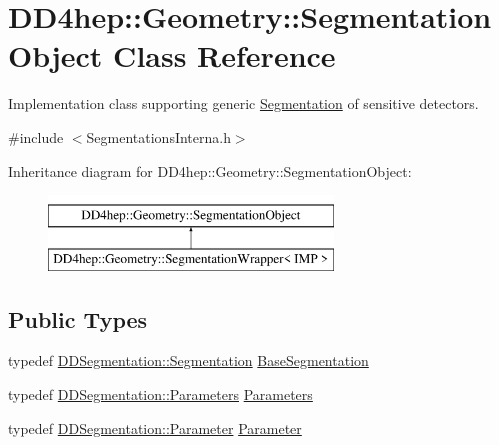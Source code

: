 \hypertarget{class_d_d4hep_1_1_geometry_1_1_segmentation_object}{}\section{D\+D4hep\+:\+:Geometry\+:\+:Segmentation\+Object Class Reference}
\label{class_d_d4hep_1_1_geometry_1_1_segmentation_object}


Implementation class supporting generic \hyperlink{class_d_d4hep_1_1_geometry_1_1_segmentation}{Segmentation} of sensitive detectors.  




{\ttfamily \#include $<$Segmentations\+Interna.\+h$>$}

Inheritance diagram for D\+D4hep\+:\+:Geometry\+:\+:Segmentation\+Object\+:\begin{figure}[H]
\begin{center}
\leavevmode
\includegraphics[height=2.000000cm]{class_d_d4hep_1_1_geometry_1_1_segmentation_object}
\end{center}
\end{figure}
\subsection*{Public Types}
\begin{DoxyCompactItemize}
\item 
typedef \hyperlink{class_d_d4hep_1_1_d_d_segmentation_1_1_segmentation}{D\+D\+Segmentation\+::\+Segmentation} \hyperlink{class_d_d4hep_1_1_geometry_1_1_segmentation_object_a57ca8eb515f079fdc61916df50468818}{Base\+Segmentation}
\item 
typedef \hyperlink{namespace_d_d4hep_1_1_d_d_segmentation_af38026430ca0e1ef64acdfc898f5dd3d}{D\+D\+Segmentation\+::\+Parameters} \hyperlink{class_d_d4hep_1_1_geometry_1_1_segmentation_object_adb4bb039e0cd15ea9fbe0232d07c49cc}{Parameters}
\item 
typedef \hyperlink{namespace_d_d4hep_1_1_d_d_segmentation_af6c6bad2a745d807a0ed00506fb34ccf}{D\+D\+Segmentation\+::\+Parameter} \hyperlink{class_d_d4hep_1_1_geometry_1_1_segmentation_object_a0d017ffe7385b6fe44bf411386cc672b}{Parameter}
\end{DoxyCompactItemize}
